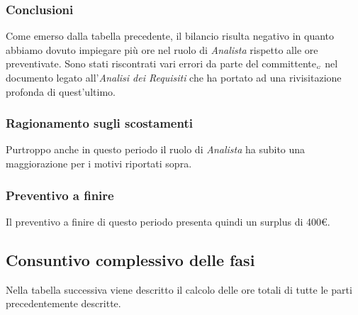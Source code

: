 {{{{{{{{{{{{\subsubsection{Conclusioni}\label{ConsuntivoTerzoPeriodoDiProgettazioneDiDettaglioCodificaConclusioni}
Come emerso dalla tabella precedente, il bilancio risulta negativo in quanto abbiamo dovuto impiegare più ore nel ruolo di \textit{Analista} rispetto alle ore preventivate. Sono stati riscontrati vari errori da parte del committente$_{\scaleto{G}{3pt}}$ nel documento legato all'\textit{Analisi dei Requisiti} che ha portato ad una rivisitazione profonda di quest'ultimo.
		
				
\subsubsection{Ragionamento sugli scostamenti}\label{ConsuntivoTerzoPeriodoDiProgettazioneDiDettaglioCodificaRagionamentoScostamenti}
Purtroppo anche in questo periodo il ruolo di \textit{Analista} ha subito una maggiorazione per i motivi riportati sopra. 
		
\subsubsection{Preventivo a finire}\label{ConsuntivoTerzoPeriodoDiProgettazioneDiDettaglioCodificaPreventivoFinire}
Il preventivo a finire di questo periodo presenta quindi un surplus di 400\euro. 
		
\subsection{Consuntivo complessivo delle fasi}\label{ConsuntivoPeriodoDiProgettazioneDettaglioCodificaComplessivoDelleFasi}
			
			Nella tabella successiva viene descritto il calcolo delle ore totali di tutte le parti precedentemente descritte.
			
}}}}}}}}}}}}
